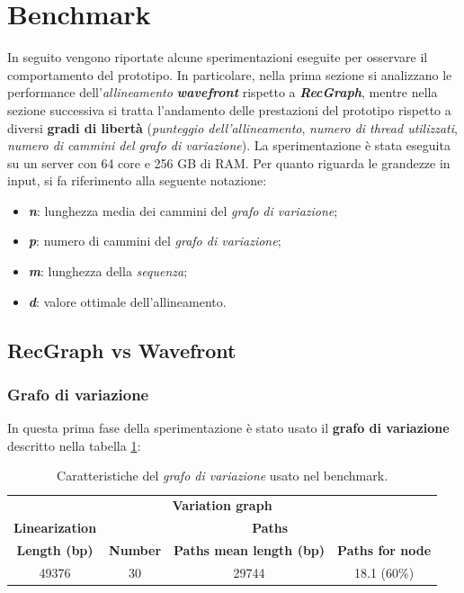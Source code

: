 \section{Benchmark}
    In seguito vengono riportate alcune sperimentazioni eseguite per osservare il comportamento del prototipo. In particolare, nella prima sezione si analizzano le performance dell'\emph{allineamento} \textbf{\textit{wavefront}} rispetto a \textbf{\textit{RecGraph}}, mentre nella sezione successiva si tratta l'andamento delle prestazioni del prototipo rispetto a diversi \textbf{gradi di libertà} (\emph{punteggio dell'allineamento}, \emph{numero di thread utilizzati}, \emph{numero di cammini del grafo di variazione}). La sperimentazione è stata eseguita su un server con 64 core e 256 GB di RAM. Per quanto riguarda le grandezze in input, si fa riferimento alla seguente notazione:
    \begin{itemize}
        \item \textbf{\textit{n}}: lunghezza media dei cammini del \emph{grafo di variazione};
        \item \textbf{\textit{p}}: numero di cammini del \emph{grafo di variazione};
        \item \textbf{\textit{m}}: lunghezza della \emph{sequenza};
        \item \textbf{\textit{d}}: valore ottimale dell'allineamento. 
    \end{itemize}

\subsection{RecGraph vs Wavefront}
\subsubsection{Grafo di variazione}
    In questa prima fase della sperimentazione è stato usato il \textbf{grafo di variazione} descritto nella tabella \ref{tab:graph}:
    \vspace{20pt}
    \begin{table}[ht]
        \centering
        \begin{tabular}{|c|c|c|c|}
        \hline
        \multicolumn{4}{|c|}{\multirow{2}{*}{\textbf{Variation graph}}} \\
        \multicolumn{4}{|c|}{} \\
        \hline
        \textbf{Linearization} & \multicolumn{3}{|c|}{\textbf{Paths}} \\
        \hline
        \textbf{Length (bp)} & \textbf{Number} & \textbf{Paths mean length (bp)} & \textbf{Paths for node} \\
        \hline
        49376 & 30 & 29744 & 18.1 (60\%) \\
        \hline
        \end{tabular}
        \caption{Caratteristiche del \emph{grafo di variazione} usato nel benchmark.}
        \label{tab:graph}
    \end{table}
    \vspace{10pt}
    
